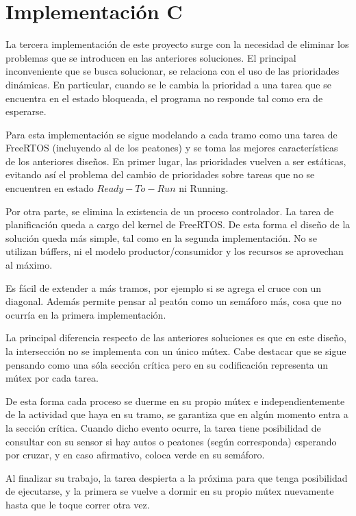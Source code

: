 \section{Implementación C}

	La tercera implementación de este proyecto surge con la necesidad de eliminar los problemas que se introducen en las anteriores soluciones.
	El principal inconveniente que se busca solucionar, se relaciona con el uso de las prioridades dinámicas.
	En particular, cuando se le cambia la prioridad a una tarea que se encuentra en el estado bloqueada, el programa no responde tal como era de esperarse.

	Para esta implementación se sigue modelando a cada tramo como una tarea de FreeRTOS (incluyendo al de los peatones) y se toma las mejores características de los anteriores diseños.
	En primer lugar, las prioridades vuelven a ser estáticas, evitando así el problema del cambio de prioridades sobre tareas que no se encuentren en estado $Ready-To-Run$ ni Running.

	Por otra parte, se elimina la existencia de un proceso controlador.
	La tarea de planificación queda a cargo del kernel de FreeRTOS.
	De esta forma el diseño de la solución queda más simple, tal como en la segunda implementación.
	No se utilizan búffers, ni el modelo productor/consumidor y los recursos se aprovechan al máximo.

	Es fácil de extender a más tramos, por ejemplo si se agrega el cruce con un diagonal.
	Además permite pensar al peatón como un semáforo más, cosa que no ocurría en la primera implementación.

	La principal diferencia respecto de las anteriores soluciones es que en este diseño, la intersección no se implementa con un único mútex.
	Cabe destacar que se sigue pensando como una sóla sección crítica pero en su codificación representa un mútex por cada tarea.

	De esta forma cada proceso se duerme en su propio mútex e independientemente de la actividad que haya en su tramo, se garantiza que en algún momento entra a la sección crítica.
	Cuando dicho evento ocurre, la tarea tiene posibilidad de consultar con su sensor si hay autos o peatones (según corresponda) esperando por cruzar, y en caso afirmativo, coloca verde en su semáforo.

	Al finalizar su trabajo, la tarea despierta a la próxima para que tenga posibilidad de ejecutarse, y la primera se vuelve a dormir en su propio mútex nuevamente hasta que le toque correr otra vez.

